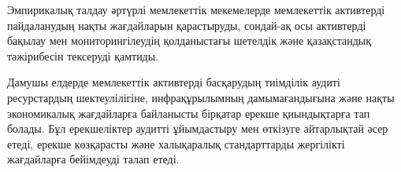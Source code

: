 % 
% 
% 
% 
% 

Эмпирикалық талдау әртүрлі мемлекеттік мекемелерде мемлекеттік
активтерді пайдаланудың нақты жағдайларын қарастыруды, сондай-ақ осы
активтерді бақылау мен мониторингілеудің қолданыстағы шетелдік және
қазақстандық тәжірибесін тексеруді қамтиды.

Дамушы елдерде мемлекеттік активтерді басқарудың тиімділік аудиті
ресурстардың шектеулілігіне, инфрақұрылымның дамымағандығына және нақты
экономикалық жағдайларға байланысты бірқатар ерекше қиындықтарға тап
болады. Бұл ерекшеліктер аудитті ұйымдастыру мен өткізуге айтарлықтай
әсер етеді, ерекше көзқарасты және халықаралық стандарттарды жергілікті
жағдайларға бейімдеуді талап етеді.

